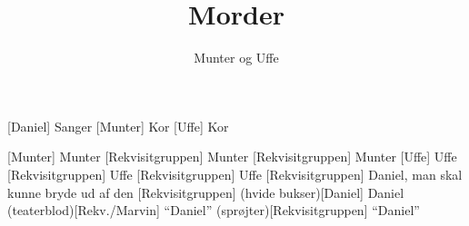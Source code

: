 \documentclass[a4paper,11pt]{article}
\title{Morder}
\author{Munter og Uffe}
\begin{document}
\maketitle

\begin{roles}  
[Daniel] Sanger
[Munter] Kor
[Uffe] Kor
\end{roles}

\begin{props}
[Munter] Munter
[Rekvisitgruppen] Munter
[Rekvisitgruppen] Munter
[Uffe] Uffe
[Rekvisitgruppen] Uffe
[Rekvisitgruppen] Uffe
[Rekvisitgruppen] Daniel, man skal kunne bryde ud af den
[Rekvisitgruppen]
\prop(hvide bukser)[Daniel] Daniel
\prop(teaterblod)[Rekv./Marvin] ``Daniel''
\prop(sprøjter)[Rekvisitgruppen] ``Daniel''
\end{props}
\end{document}
